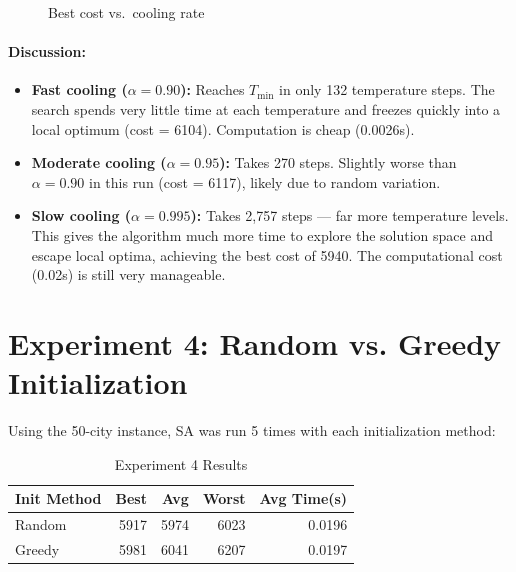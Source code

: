 \documentclass[12pt,a4paper]{article}
\begin{document}
\begin{figure}[H]
\centering
{}
\caption{Best cost vs.\ cooling rate}
\end{figure}

\paragraph{Discussion:}
\begin{itemize}
    \item \textbf{Fast cooling ($\alpha = 0.90$):} Reaches $T_{\min}$ in only 132 temperature steps. The search spends very little time at each temperature and freezes quickly into a local optimum (cost = 6104). Computation is cheap (0.0026s).
    \item \textbf{Moderate cooling ($\alpha = 0.95$):} Takes 270 steps. Slightly worse than $\alpha = 0.90$ in this run (cost = 6117), likely due to random variation.
    \item \textbf{Slow cooling ($\alpha = 0.995$):} Takes 2{,}757 steps --- far more temperature levels. This gives the algorithm much more time to explore the solution space and escape local optima, achieving the best cost of 5940. The computational cost (0.02s) is still very manageable.
\end{itemize}

\section{Experiment 4: Random vs. Greedy Initialization}

Using the 50-city instance, SA was run 5 times with each initialization method:

\begin{table}[H]
\centering
\caption{Experiment 4 Results}
\begin{tabular}{@{}lrrrr@{}}
\toprule
\textbf{Init Method} & \textbf{Best} & \textbf{Avg} & \textbf{Worst} & \textbf{Avg Time(s)} \\
\midrule
Random & 5917 & 5974 & 6023 & 0.0196 \\
Greedy & 5981 & 6041 & 6207 & 0.0197 \\
\bottomrule
\end{tabular}
\end{table}
\end{document}
